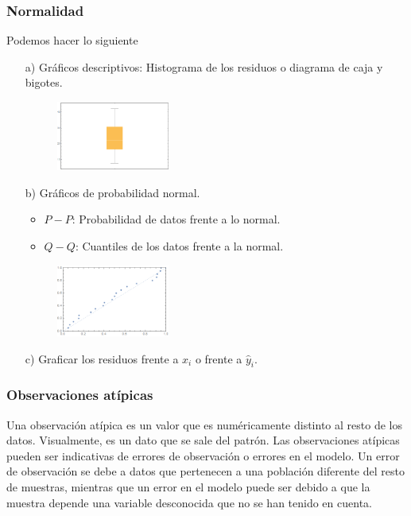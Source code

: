 \subsubsection{Normalidad}
\noindent Podemos hacer lo siguiente
\begin{enumerate}
    \item[a)] Gráficos descriptivos: Histograma de los residuos o diagrama de caja y bigotes.
        \begin{figure}[H]
            \centering
            \includegraphics[width=0.35\textwidth]{imagenes1/histo.png}
        \end{figure}
    \item[b)] Gráficos de probabilidad normal.
    \begin{itemize}
        \item $P-P$: Probabilidad de datos frente a lo normal.
        \item $Q-Q$: Cuantiles de los datos frente a la normal.
    \end{itemize}
            \begin{figure}[H]
            \centering
            \includegraphics[width=0.35\textwidth]{imagenes1/probdatos.png}
        \end{figure}
    \item[c)] Graficar los residuos frente a $x_i$ o frente a $\widehat{y}_i$.
\end{enumerate}

\subsubsection{Observaciones atípicas}
\noindent Una observación atípica es un valor que es numéricamente distinto al resto de los datos. Visualmente, es un dato que se sale del patrón.
Las observaciones atípicas pueden ser indicativas de errores de observación o errores en el modelo. Un error de observación se debe a datos que pertenecen a una población diferente del resto de muestras, mientras que un error en el modelo puede ser debido a que la muestra depende una variable desconocida que no se han tenido en cuenta.

